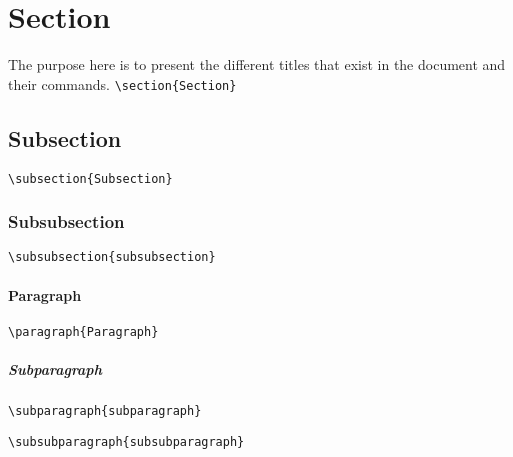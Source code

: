 \section{Section}
The purpose here is to present the different titles that exist in the document
and their commands. \newline
\verb=\section{Section}= \newline

\lipsum[1]

\subsection{Subsection}

\verb=\subsection{Subsection}= \newline

\lipsum[2]

\subsubsection{Subsubsection}

\verb=\subsubsection{subsubsection}= \newline

\lipsum[3]

\paragraph{Paragraph}

\verb=\paragraph{Paragraph}= \newline

\lipsum[4]

\subparagraph{Subparagraph}

\verb=\subparagraph{subparagraph}= \newline

\lipsum[5]


\verb=\subsubparagraph{subsubparagraph}= \newline

\lipsum[6]